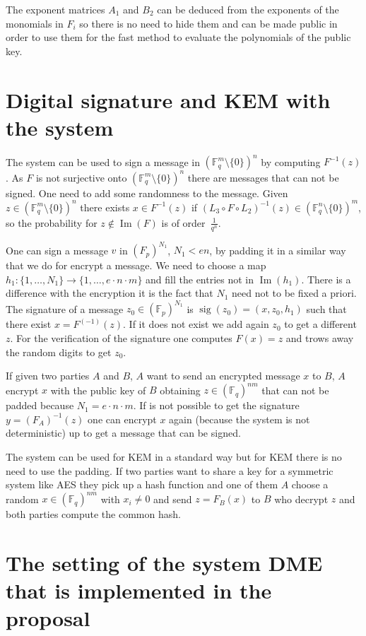 \documentclass[12pt,a4paper]{amsart}
\theoremstyle{remark}
\theoremstyle{definition}
\begin{document}
The exponent matrices $A_1$ and $B_2$ can be deduced from the exponents of the monomials in $F_i$ so there is no need to hide them and can be made public in order to use them for the fast method to evaluate the polynomials of the public key.

\section*{Digital signature and KEM with the system}
The system can be used to sign  a message in $
(\mathbb{F}_q^m\setminus\{0\})^n
$ by computing $F^{-1}(z)$. As $F$ is not surjective onto 
$(\mathbb{F}_q^m\setminus\{0\})^n$ there are messages that can not be signed. 
One need to add some randomness to the message.
Given $z\in(\mathbb{F}_q^m\setminus\{0\})^n$ there exists $x\in F^{-1}(z)$
if $(L_3\circ F\circ L_2)^{-1}(z)\in(\mathbb{F}_q^n\setminus\{0\})^m$, so the probability
for $z\notin\operatorname{Im}(F)$ is of order~$\frac{1}{q^n}$.

One can sign a message $v$ in $(F_p)^{N_1}$, $N_1<e  n$, by padding it in a similar way that we do for encrypt a message.
We need to choose a map $h_1:\{1,\dots,N_1\} \to  \{1,\dots,e\cdot n\cdot m\}$ and fill the entries not in $\operatorname{Im}(h_1)$. There is a  difference  with the encryption it is the fact that $N_1$ need not to be fixed a priori. 
The signature of a message $z_0\in (\mathbb{F}_p)^{N_1}$ is 
$\operatorname{sig}(z_0)=(x,z_0,h_1)$ such that there exist $x=F^(-1)(z)$. 
If it does not exist we add again $z_0$ to get a different $z$.
For the verification of the signature one computes $F(x)=z$ and trows away the random digits to get $z_0$.

If given two parties $A$ and $B$, $A$ want to send an encrypted message $x$ to $B$, 
$A$ encrypt $x$ with the public key 
of $B$ obtaining $z \in (\mathbb{F}_q)^{nm}$ that can not be padded because 
$N_1=e\cdot n\cdot m$. 
If is not possible to get the signature $y=(F_A)^{-1}(z)$ one can encrypt $x$ again (because the system is not deterministic) up to get a message that can be signed.

The system can be used for KEM in a standard way but for KEM there is no need to use the padding. 
If two parties want to share a key for a symmetric system like AES they pick up  a hash function and 
one of them $A$ choose a random $x \in (\mathbb{F}_q)^{nm}$ with $x_i \neq 0$ 
and send $z=F_B(x)$ to $B$ who decrypt $z$ and both parties compute the common hash.


\section*{The setting of the system DME that is implemented in the proposal}
\end{document}
